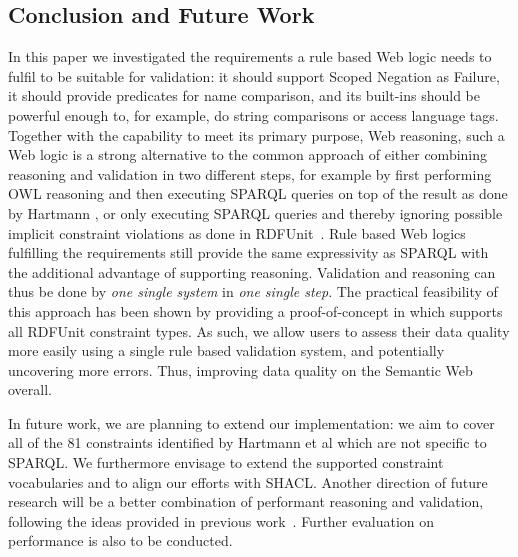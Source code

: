 \subsection{Conclusion and Future Work}\label{conc}
In this paper we investigated the requirements a rule based Web logic needs to fulfil to be suitable for \rdf validation:
it should support Scoped Negation as Failure, it should provide predicates for name comparison, and its built-ins should be powerful enough to, for example, 
do string comparisons or access language tags.  Together with the capability to meet its primary purpose, Web reasoning, such a Web logic is
a strong alternative to the common approach of either combining reasoning and validation in two different steps, for example by first performing OWL reasoning and 
then executing SPARQL queries on top of the result as done by Hartmann \cite{hartmann2016}, or only executing SPARQL queries and thereby ignoring possible 
implicit constraint violations
as done in RDFUnit~\cite{kontokostas2014test}. Rule based Web logics fulfilling the requirements still provide the same expressivity as SPARQL with the additional advantage
of supporting reasoning. Validation and reasoning can thus be done by \emph{one single system} in \emph{one single step}. 
%
The practical feasibility of this approach has been shown by providing a proof-of-concept in \nthreelogic which supports all RDFUnit constraint types. 
As such, we allow users to assess 
their data quality more easily using a single rule based validation system, and potentially uncovering more errors. Thus, improving data quality on the Semantic Web overall.

In future work, we are planning to extend our implementation:
we aim to cover all of the 81 constraints identified by Hartmann et al \cite{bosch2015} which are not specific to SPARQL. We furthermore 
envisage to extend the supported \rdf constraint vocabularies and to align our efforts with SHACL.  
Another direction of future research will be a better combination of performant reasoning and validation, following the ideas provided in previous work~\cite{arndt_owled_2015}.
Further evaluation on performance is also to be conducted.
